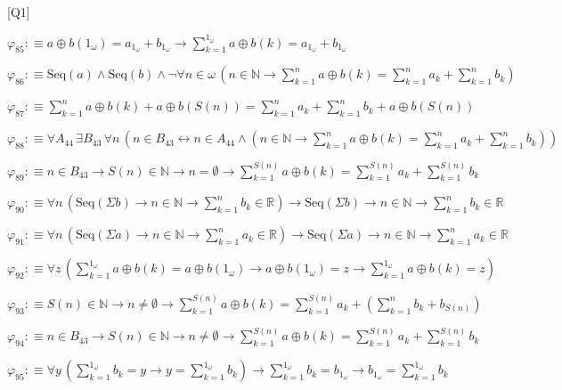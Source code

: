 \begin{fullproof}{[Q1]}
\begin{abbrevlist}
\item $\varphi_{85} :\equiv a \oplus b(1_{\omega}) = a_{1_{\omega}} + b_{1_{\omega}} \to {\textstyle\sum_{k=1}^{1_{\omega}} a \oplus b(k)} = a_{1_{\omega}} + b_{1_{\omega}}$
\item $\varphi_{86} :\equiv \mathrm{Seq}(a) \land \mathrm{Seq}(b) \land \neg \forall n \in \omega\,(n \in \mathbb{N} \to {\textstyle\sum_{k=1}^{n} a \oplus b(k)} = {\textstyle\sum_{k=1}^{n} a_{k}} + {\textstyle\sum_{k=1}^{n} b_{k}})$
\item $\varphi_{87} :\equiv {\textstyle\sum_{k=1}^{n} a \oplus b(k)} + a \oplus b(S(n)) = {\textstyle\sum_{k=1}^{n} a_{k}} + {\textstyle\sum_{k=1}^{n} b_{k}} + a \oplus b(S(n))$
\item $\varphi_{88} :\equiv \forall A_{44}\,\exists B_{43}\,\forall n\,(n \in B_{43} \leftrightarrow n \in A_{44} \land (n \in \mathbb{N} \to {\textstyle\sum_{k=1}^{n} a \oplus b(k)} = {\textstyle\sum_{k=1}^{n} a_{k}} + {\textstyle\sum_{k=1}^{n} b_{k}}))$
\item $\varphi_{89} :\equiv n \in B_{43} \to S(n) \in \mathbb{N} \to n = \emptyset \to {\textstyle\sum_{k=1}^{S(n)} a \oplus b(k)} = {\textstyle\sum_{k=1}^{S(n)} a_{k}} + {\textstyle\sum_{k=1}^{S(n)} b_{k}}$
\item $\varphi_{90} :\equiv \forall n\,(\mathrm{Seq}(\Sigma b) \to n \in \mathbb{N} \to {\textstyle\sum_{k=1}^{n} b_{k}} \in \mathbb{R}) \to \mathrm{Seq}(\Sigma b) \to n \in \mathbb{N} \to {\textstyle\sum_{k=1}^{n} b_{k}} \in \mathbb{R}$
\item $\varphi_{91} :\equiv \forall n\,(\mathrm{Seq}(\Sigma a) \to n \in \mathbb{N} \to {\textstyle\sum_{k=1}^{n} a_{k}} \in \mathbb{R}) \to \mathrm{Seq}(\Sigma a) \to n \in \mathbb{N} \to {\textstyle\sum_{k=1}^{n} a_{k}} \in \mathbb{R}$
\item $\varphi_{92} :\equiv \forall z\,({\textstyle\sum_{k=1}^{1_{\omega}} a \oplus b(k)} = a \oplus b(1_{\omega}) \to a \oplus b(1_{\omega}) = z \to {\textstyle\sum_{k=1}^{1_{\omega}} a \oplus b(k)} = z)$
\item $\varphi_{93} :\equiv S(n) \in \mathbb{N} \to n \neq \emptyset \to {\textstyle\sum_{k=1}^{S(n)} a \oplus b(k)} = {\textstyle\sum_{k=1}^{S(n)} a_{k}} + ({\textstyle\sum_{k=1}^{n} b_{k}} + b_{S(n)})$
\item $\varphi_{94} :\equiv n \in B_{43} \to S(n) \in \mathbb{N} \to n \neq \emptyset \to {\textstyle\sum_{k=1}^{S(n)} a \oplus b(k)} = {\textstyle\sum_{k=1}^{S(n)} a_{k}} + {\textstyle\sum_{k=1}^{S(n)} b_{k}}$
\item $\varphi_{95} :\equiv \forall y\,({\textstyle\sum_{k=1}^{1_{\omega}} b_{k}} = y \to y = {\textstyle\sum_{k=1}^{1_{\omega}} b_{k}}) \to {\textstyle\sum_{k=1}^{1_{\omega}} b_{k}} = b_{1_{\omega}} \to b_{1_{\omega}} = {\textstyle\sum_{k=1}^{1_{\omega}} b_{k}}$

\end{abbrevlist}
\end{fullproof}
